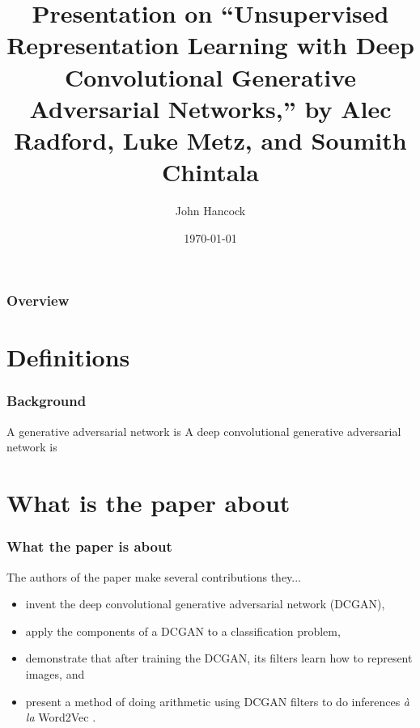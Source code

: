 \documentclass{beamer}
\title[Unsupervised Representation Learning with Deep Convolutional
Generative Adversarial Networks]{Presentation on ``Unsupervised Representation 
Learning with Deep Convolutional Generative Adversarial Networks,'' by Alec Radford, Luke Metz, and Soumith Chintala} %
\author{John Hancock} %
\institute[FAU] %
{
Florida Atlantic University \\ %
\medskip
\textit{jhancoc4@fau.edu} %
}
\date{\today} %
\begin{document}
\begin{frame}
\titlepage %
\end{frame}

\begin{frame}
\frametitle{Overview} %
\tableofcontents %
\end{frame}


\section{Definitions} %

\begin{frame}
\frametitle{Background}
A generative adversarial network is
A deep convolutional generative adversarial network is
\end{frame}

\section{What is the paper about}
\begin{frame}
\frametitle{What the paper is about}
The authors of the paper make several contributions they...
\begin{itemize}
  \item invent the deep convolutional generative adversarial network (DCGAN),
  \item apply the components of a DCGAN to a classification problem,
  \item demonstrate that after training the DCGAN, its filters learn how to
    represent images, and
  \item present a method of doing arithmetic using DCGAN filters to do 
    inferences \emph{{\`a} la} Word2Vec \cite{word2Vec}.
\end{itemize}
\end{frame}
\end{document}
